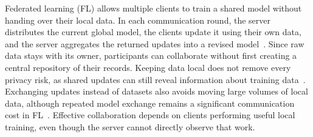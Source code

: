\documentclass[conference]{IEEEtran}
\begin{document}
Federated learning (FL) allows multiple clients to train a shared model
without handing over their local data. In each communication round, the
server distributes the current global model, the clients update it using
their own data, and the server aggregates the returned updates into a
revised model~\cite{mcmahan2017communication}. Since raw data stays with
its owner, participants can collaborate without first creating a central
repository of their records. Keeping data local does not remove every
privacy risk, as shared updates can still reveal information about
training data~\cite{kairouz2021advances,zhu2019leakage,melis2019leakage}.
Exchanging updates instead of
datasets also avoids moving large volumes of local data, although repeated
model exchange remains a significant communication cost in
FL~\cite{mcmahan2017communication}. Effective collaboration depends on clients
performing useful local training, even though the server cannot directly
observe that work.
\end{document}
